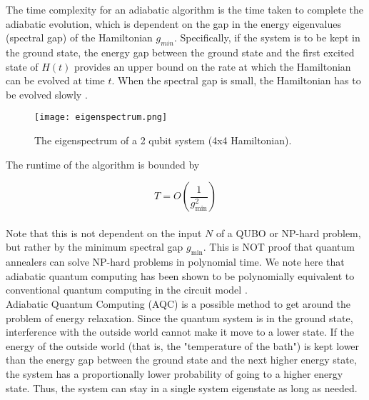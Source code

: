\documentclass[12pt,a4paper]{report}
\begin{document}
\newpage
\noindent
The time complexity for an adiabatic algorithm is the time taken to complete the adiabatic evolution, which is dependent on the gap in the energy eigenvalues (spectral gap) of the Hamiltonian \textbf{\(g_{min}\)}. Specifically, if the system is to be kept in the ground state, the energy gap between the ground state and the first excited state of \( H(t) \) provides an upper bound on the rate at which the Hamiltonian can be evolved at time \( t \). When the spectral gap is small, the Hamiltonian has to be evolved slowly \cite{power_of_adiabatic_quantum_computation}.

\begin{figure}[!h]
    \centering
    \texttt{[image: eigenspectrum.png]}
    \caption{The eigenspectrum of a 2 qubit system (4x4 Hamiltonian).}
    \label{fig:eigenspectrum}
\end{figure}

\noindent
The runtime of the algorithm is bounded by

\[
T = O\left(\frac{1}{g_{\text{min}}^2}\right)
\]
\\

\noindent
Note that this is not dependent on the input \( N \) of a QUBO or NP-hard problem, but rather by the minimum spectral gap \( g_{\text{min}} \). This is NOT proof that quantum annealers can solve NP-hard problems in polynomial time. We note here that adiabatic quantum computing has been shown to be polynomially equivalent to conventional quantum computing in the circuit model \cite{adiabatic_same_as_classical}.
\\

\noindent
Adiabatic Quantum Computing (AQC) is a possible method to get around the problem of energy relaxation. Since the quantum system is in the ground state, interference with the outside world cannot make it move to a lower state. If the energy of the outside world (that is, the "temperature of the bath") is kept lower than the energy gap between the ground state and the next higher energy state, the system has a proportionally lower probability of going to a higher energy state. Thus, the system can stay in a single system eigenstate as long as needed.

\newpage
\end{document}
